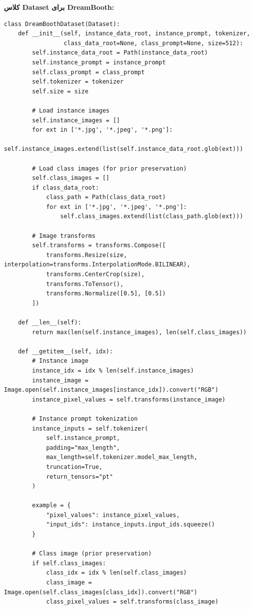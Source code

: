 \textbf{کلاس Dataset برای DreamBooth:}
\begin{verbatim}
class DreamBoothDataset(Dataset):
    def __init__(self, instance_data_root, instance_prompt, tokenizer,
                 class_data_root=None, class_prompt=None, size=512):
        self.instance_data_root = Path(instance_data_root)
        self.instance_prompt = instance_prompt
        self.class_prompt = class_prompt
        self.tokenizer = tokenizer
        self.size = size
        
        # Load instance images
        self.instance_images = []
        for ext in ['*.jpg', '*.jpeg', '*.png']:
            self.instance_images.extend(list(self.instance_data_root.glob(ext)))
        
        # Load class images (for prior preservation)
        self.class_images = []
        if class_data_root:
            class_path = Path(class_data_root)
            for ext in ['*.jpg', '*.jpeg', '*.png']:
                self.class_images.extend(list(class_path.glob(ext)))
        
        # Image transforms
        self.transforms = transforms.Compose([
            transforms.Resize(size, interpolation=transforms.InterpolationMode.BILINEAR),
            transforms.CenterCrop(size),
            transforms.ToTensor(),
            transforms.Normalize([0.5], [0.5])
        ])
    
    def __len__(self):
        return max(len(self.instance_images), len(self.class_images))
    
    def __getitem__(self, idx):
        # Instance image
        instance_idx = idx % len(self.instance_images)
        instance_image = Image.open(self.instance_images[instance_idx]).convert("RGB")
        instance_pixel_values = self.transforms(instance_image)
        
        # Instance prompt tokenization
        instance_inputs = self.tokenizer(
            self.instance_prompt,
            padding="max_length",
            max_length=self.tokenizer.model_max_length,
            truncation=True,
            return_tensors="pt"
        )
        
        example = {
            "pixel_values": instance_pixel_values,
            "input_ids": instance_inputs.input_ids.squeeze()
        }
        
        # Class image (prior preservation)
        if self.class_images:
            class_idx = idx % len(self.class_images)
            class_image = Image.open(self.class_images[class_idx]).convert("RGB")
            class_pixel_values = self.transforms(class_image)
            

\end{verbatim}
